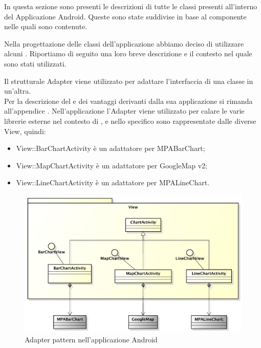         In questa sezione sono presenti le descrizioni di tutte le classi presenti all'interno del  Applicazione Android. Queste sono state suddivise in base al componente nelle quali sono contenute.
        
        
    

        Nella progettazione delle classi dell'applicazione abbiamo deciso di utilizzare alcuni . Riportiamo di seguito una loro breve descrizione e il contesto nel quale sono stati utilizzati.
        
            Il  strutturale Adapter viene utilizzato per adattare l'interfaccia di una classe in un'altra.\\
            Per la descrizione del  e dei vantaggi derivanti dalla sua applicazione si rimanda all'appendice .
                Nell'applicazione  l'Adapter viene utilizzato per calare le varie librerie esterne nel contesto di \projectname{}, e nello specifico sono rappresentate dalle diverse View, quindi:
                \begin{itemize}
                    \item View::BarChartActivity è un adattatore per MPABarChart;
                    \item View::MapChartActivity è un adattatore per GoogleMap   v2;
                    \item View::LineChartActivity è un adattatore per MPALineChart.
                \end{itemize}
                \begin{figure}[H]\centering
	        		\includegraphics[width=\textwidth]{SpecificaTecnica/Pics/DesignPatternApp/Adapter}
	        		\caption{Adapter pattern nell'applicazione Android}
	    		\end{figure}
                

